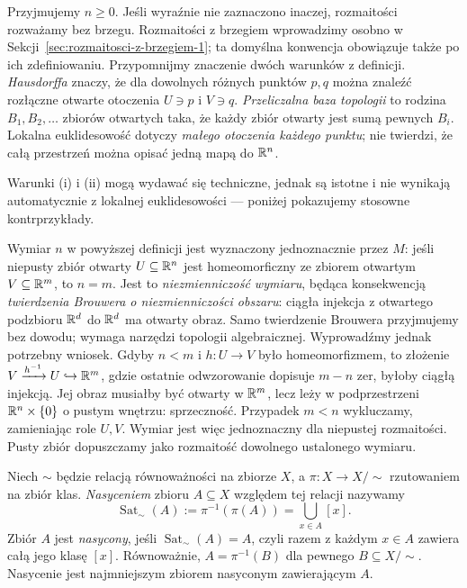 Przyjmujemy $n\geq0$. Jeśli wyraźnie nie zaznaczono inaczej,
rozmaitości rozważamy bez brzegu. Rozmaitości z brzegiem
wprowadzimy osobno w Sekcji~\ref{sec:rozmaitosci-z-brzegiem-1};
ta domyślna konwencja obowiązuje także po ich zdefiniowaniu.
Przypomnijmy znaczenie dwóch warunków z definicji.
\emph{Hausdorffa} znaczy, że dla dowolnych różnych punktów
$p,q$ można znaleźć rozłączne otwarte otoczenia $U\ni p$
i $V\ni q$. \emph{Przeliczalna baza topologii} to rodzina
$B_1,B_2,\ldots$ zbiorów otwartych taka, że każdy zbiór
otwarty jest sumą pewnych $B_i$. Lokalna euklidesowość
dotyczy \emph{małego otoczenia każdego punktu}; nie twierdzi,
że całą przestrzeń można opisać jedną mapą do $\mathbb{R}^n$.

Warunki (i) i (ii) mogą wydawać się techniczne, jednak są istotne i nie wynikają
automatycznie z lokalnej euklidesowości — poniżej pokazujemy stosowne kontrprzykłady.

\begin{uwaga}
Wymiar $n$ w powyższej definicji jest wyznaczony jednoznacznie przez $M$: jeśli niepusty
zbiór otwarty $U\subseteq\mathbb{R}^n$ jest homeomorficzny ze zbiorem otwartym $V\subseteq\mathbb{R}^m$, to
$n=m$. Jest to \emph{niezmienniczość wymiaru}, będąca konsekwencją
\emph{twierdzenia Brouwera o niezmienniczości obszaru}: ciągła injekcja
z otwartego podzbioru $\mathbb{R}^d$ do $\mathbb{R}^d$ ma otwarty obraz.
Samo twierdzenie Brouwera przyjmujemy bez dowodu; wymaga narzędzi
topologii algebraicznej. Wyprowadźmy jednak potrzebny wniosek.
Gdyby $n<m$ i $h:U\to V$ było homeomorfizmem, to złożenie
$V\xrightarrow{h^{-1}}U\hookrightarrow\mathbb{R}^m$, gdzie ostatnie
odwzorowanie dopisuje $m-n$ zer, byłoby ciągłą injekcją.
Jej obraz musiałby być otwarty w $\mathbb{R}^m$, lecz leży w podprzestrzeni
$\mathbb{R}^n\times\{0\}$ o pustym wnętrzu: sprzeczność.
Przypadek $m<n$ wykluczamy, zamieniając role $U,V$.
Wymiar jest więc jednoznaczny dla niepustej rozmaitości.
Pusty zbiór dopuszczamy jako rozmaitość dowolnego ustalonego wymiaru.
\end{uwaga}

\begin{definicja}\label{def:nasycenie}
Niech $\sim$ będzie relacją równoważności na zbiorze $X$,
a $\pi\colon X\to X/{\sim}$ rzutowaniem na zbiór klas.
\emph{Nasyceniem} zbioru $A\subseteq X$ względem tej relacji
nazywamy
\[
 \operatorname{Sat}_{\sim}(A)
 :=\pi^{-1}(\pi(A))
 =\bigcup_{x\in A}[x].
\]
Zbiór $A$ jest \emph{nasycony}, jeśli
$\operatorname{Sat}_{\sim}(A)=A$, czyli razem z każdym
$x\in A$ zawiera całą jego klasę $[x]$.
Równoważnie, $A=\pi^{-1}(B)$ dla pewnego
$B\subseteq X/{\sim}$. Nasycenie jest najmniejszym
zbiorem nasyconym zawierającym $A$.
\end{definicja}

